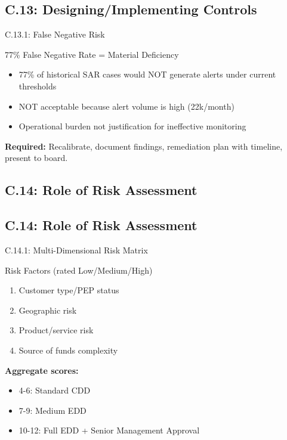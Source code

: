 \documentclass{beamer}
\begin{document}
\subsection{C.13: Designing/Implementing Controls}

\begin{frame}{C.13.1: False Negative Risk}
	\begin{block}{77\% False Negative Rate = Material Deficiency}
		\begin{itemize}
			\item 77\% of historical SAR cases would NOT generate alerts under current thresholds
			\item NOT acceptable because alert volume is high (22k/month)
			\item Operational burden not justification for ineffective monitoring
		\end{itemize}
		\textbf{Required:} Recalibrate, document findings, remediation plan with timeline, present to board.
	\end{block}
\end{frame}  %

\subsection{C.14: Role of Risk Assessment}
		\subsection{C.14: Role of Risk Assessment}
		
		\begin{frame}{C.14.1: Multi-Dimensional Risk Matrix}
			\begin{block}{Risk Factors (rated Low/Medium/High)}
				\begin{enumerate}
					\item Customer type/PEP status
					\item Geographic risk
					\item Product/service risk
					\item Source of funds complexity
				\end{enumerate}
				\textbf{Aggregate scores:}
				\begin{itemize}
					\item 4-6: Standard CDD
					\item 7-9: Medium EDD
					\item 10-12: Full EDD + Senior Management Approval
				\end{itemize}
			\end{block}
		\end{frame}
		
\end{document}
